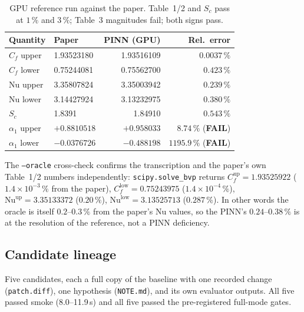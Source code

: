 \documentclass[11pt,a4paper]{article}
\newcommand{\code}[1]{\texttt{\small #1}}
\newcommand{\pct}{\,\%}
\begin{document}
\begin{table}[ht]
\centering
\caption{GPU reference run against the paper. Table~1/2 and $S_c$ pass at $1\pct$ and
$3\pct$; Table~3 magnitudes fail; both signs pass.}
\label{tab:gpuref}
\small
\begin{tabular}{@{}llrr@{}}
\toprule
\textbf{Quantity} & \textbf{Paper} & \textbf{PINN (GPU)} & \textbf{Rel.\ error} \\
\midrule
$C_f$ upper        & 1.93523180 & 1.93516109 & $0.0037\pct$ \\
$C_f$ lower        & 0.75244081 & 0.75562700 & $0.423\pct$ \\
$\mathrm{Nu}$ upper & 3.35807824 & 3.35003942 & $0.239\pct$ \\
$\mathrm{Nu}$ lower & 3.14427924 & 3.13232975 & $0.380\pct$ \\
$S_c$              & 1.8391     & 1.84910    & $0.543\pct$ \\
$\alpha_1$ upper   & $+0.8810518$ & $+0.958033$ & $8.74\pct$ \;(\textbf{FAIL}) \\
$\alpha_1$ lower   & $-0.0376726$ & $-0.488198$ & $1195.9\pct$ \;(\textbf{FAIL}) \\
\bottomrule
\end{tabular}
\end{table}

\noindent The \code{--oracle} cross-check confirms the transcription and the paper's own
Table~1/2 numbers independently: \code{scipy.solve\_bvp} returns
$C_f^{\mathrm{up}}=1.93525922$ ($1.4\times10^{-3}\pct$ from the paper),
$C_f^{\mathrm{low}}=0.75243975$ ($1.4\times10^{-4}\pct$),
$\mathrm{Nu}^{\mathrm{up}}=3.35133372$ ($0.20\pct$),
$\mathrm{Nu}^{\mathrm{low}}=3.13525713$ ($0.287\pct$). In other words the oracle is itself
$0.2$--$0.3\pct$ from the paper's $\mathrm{Nu}$ values, so the PINN's $0.24$--$0.38\pct$
is at the resolution of the reference, not a PINN deficiency.

\subsection{Candidate lineage}
Five candidates, each a full copy of the baseline with one recorded change
(\code{patch.diff}), one hypothesis (\code{NOTE.md}), and its own evaluator outputs. All
five passed smoke (8.0--11.9\,s) and all five passed the pre-registered full-mode gates.
\end{document}
